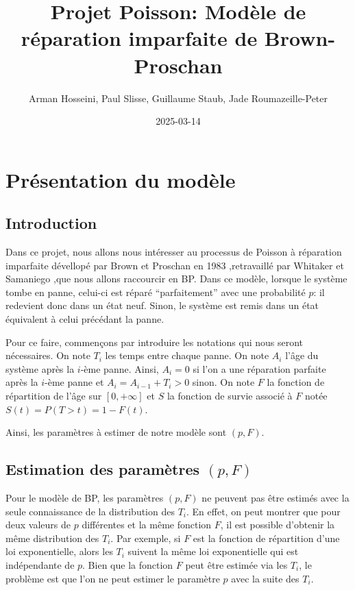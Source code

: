 \documentclass[
]{article}
\title{Projet Poisson: Modèle de réparation imparfaite de
Brown-Proschan}
\author{Arman Hosseini, Paul Slisse, Guillaume Staub, Jade
Roumazeille-Peter}
\date{2025-03-14}
\begin{document}
\maketitle

{
\setcounter{tocdepth}{2}
\tableofcontents
}
\newpage

\section{Présentation du modèle}\label{pruxe9sentation-du-moduxe8le}

\subsection{Introduction}\label{introduction}

Dans ce projet, nous allons nous intéresser au processus de Poisson à
réparation imparfaite dévellopé par Brown et Proschan
\autocite{Brown1983} en 1983 ,retravaillé par Whitaker et Samaniego
\autocite{Whitaker1989},que nous allons raccourcir en BP. Dans ce
modèle, lorsque le système tombe en panne, celui-ci est réparé
``parfaitement'' avec une probabilité \(p\): il redevient donc dans un
état neuf. Sinon, le système est remis dans un état équivalent à celui
précédant la panne.

Pour ce faire, commençons par introduire les notations qui nous seront
nécessaires. On note \(T_i\) les temps entre chaque panne. On note
\(A_i\) l'âge du système après la \(i\)-ème panne. Ainsi, \(A_i=0\) si
l'on a une réparation parfaite après la \(i\)-ème panne et
\(A_i=A_{i-1}+T_i>0\) sinon. On note \(F\) la fonction de répartition de
l'âge sur \([0,+\infty]\) et \(S\) la fonction de survie associé à \(F\)
notée \(S(t)=P(T>t)=1-F(t)\).

Ainsi, les paramètres à estimer de notre modèle sont \((p,F)\).

\subsection{\texorpdfstring{Estimation des paramètres
\((p,F)\)}{Estimation des paramètres (p,F)}}\label{estimation-des-paramuxe8tres-pf}

Pour le modèle de BP, les paramètres \((p,F)\) ne peuvent pas être
estimés avec la seule connaissance de la distribution des \(T_i\). En
effet, on peut montrer que pour deux valeurs de \(p\) différentes et la
même fonction \(F\), il est possible d'obtenir la même distribution des
\(T_i\). Par exemple, si \(F\) est la fonction de répartition d'une loi
exponentielle, alors les \(T_i\) suivent la même loi exponentielle qui
est indépendante de \(p\). Bien que la fonction \(F\) peut être estimée
via les \(T_i\), le problème est que l'on ne peut estimer le paramètre
\(p\) avec la suite des \(T_i\).
\end{document}
